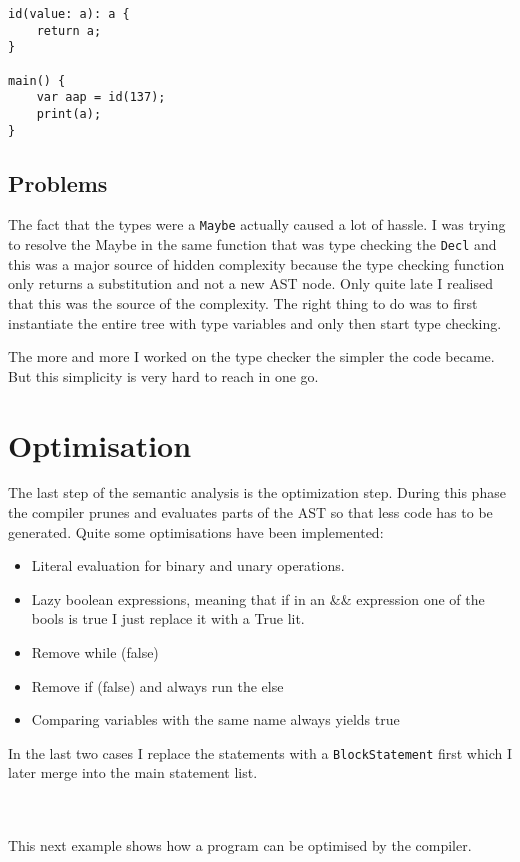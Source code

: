 \documentclass{report}
\begin{document}
\begin{lstlisting}[style=SPL]
id(value: a): a {
    return a;
}

main() { 
    var aap = id(137);
    print(a);
}
\end{lstlisting}

\subsection{Problems}

\noindent The fact that the types were a \texttt{Maybe} actually caused a lot of hassle. I was trying to resolve the Maybe in the same function that was type checking the \texttt{Decl} and this was a major source of hidden complexity because the type checking function only returns a substitution and not a new AST node. Only quite late I realised that this was the source of the complexity. The right thing to do was to first instantiate the entire tree with type variables and only then start type checking. 

The more and more I worked on the type checker the simpler the code became. But this simplicity is
very hard to reach in one go.

\section{Optimisation} \label{sec:Optimisation}

The last step of the semantic analysis is the optimization step. During this phase the compiler prunes and evaluates parts of the AST so that less code has to be generated. Quite some optimisations have been implemented:
\begin{itemize}
    \item Literal evaluation for binary and unary operations.
    \item Lazy boolean expressions, meaning that if in an && expression one of the bools is true I just replace it with a True lit.
    \item Remove while (false)
    \item Remove if (false) and always run the else
    \item Comparing variables with the same name always yields true
\end{itemize}

\noindent In the last two cases I replace the statements with a \texttt{BlockStatement} first which I later merge into the main statement list.

\\\\
\noindent This next example shows how a program can be optimised by the compiler.
\end{document}
